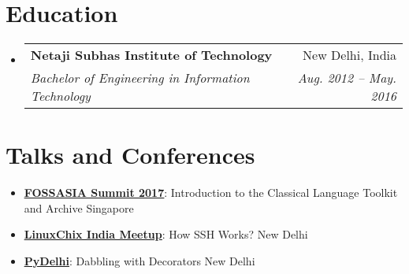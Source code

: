\documentclass[letterpaper,11pt]{article}
\makeatletter
\newcommand{\resumeItem}[2]{
  \item\small{
    \textbf{#1}{: #2 \vspace{-2pt}}
  }
}
\newcommand{\resumeSubheading}[4]{
  \vspace{-1pt}\item
    \begin{tabular*}{0.97\textwidth}{l@{\extracolsep{\fill}}r}
      \textbf{#1} & #2 \\
      \textit{\small#3} & \textit{\small #4} \\
    \end{tabular*}\vspace{-5pt}
}
\newcommand{\resumeSubItem}[2]{\resumeItem{#1}{#2}\vspace{-4pt}}
\newcommand{\resumeSubHeadingListStart}{\begin{itemize}[leftmargin=*]}
\newcommand{\resumeSubHeadingListEnd}{\end{itemize}}
\makeatother
\begin{document}
\section{Education}
  \resumeSubHeadingListStart
    \resumeSubheading
      {Netaji Subhas Institute of Technology}{New Delhi, India}
      {Bachelor of Engineering in Information Technology}{Aug. 2012 -- May. 2016}
  \resumeSubHeadingListEnd


\section{Talks and Conferences}
 \resumeSubHeadingListStart
    \resumeSubItem{\href{https://2017.fossasia.org/tracks.html\#2891}{\underline{FOSSASIA Summit 2017}}}{Introduction to the Classical Language Toolkit and Archive}\hfill{Singapore}
    \resumeSubItem{\href{https://github.com/linuxchixin/talks}{\underline{LinuxChix India Meetup}}}
       {How SSH Works?}\hfill{New Delhi}
    \resumeSubItem{\href{https://www.meetup.com/pydelhi/events/mglhqpyxhbqb/}{\underline{PyDelhi}}}
       {Dabbling with Decorators}\hfill{New Delhi}
 \resumeSubHeadingListEnd
\end{document}
